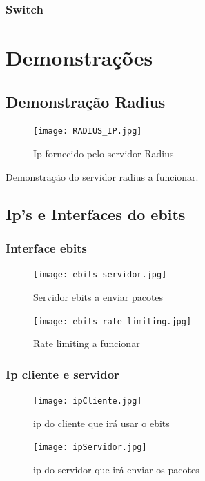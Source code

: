 \documentclass[a4paper,titlepage]{article}
\begin{document}
						\subsubsection{Switch}
							
	\section{Demonstrações}
			\subsection{Demonstração Radius}
						\begin{figure}[H]
								\centering
								\texttt{[image: RADIUS\_IP.jpg]}
								\caption{Ip fornecido pelo servidor Radius}
						\end{figure}
						Demonstração do servidor radius a funcionar.\\
						
			\subsection{Ip's e Interfaces do ebits}
					\subsubsection{Interface ebits}
						\begin{figure}[H]
								\centering
								\texttt{[image: ebits\_servidor.jpg]}
								\caption{Servidor ebits a enviar pacotes}
						\end{figure}
						\begin{figure}[H]
								\centering
								\texttt{[image: ebits-rate-limiting.jpg]}
								\caption{Rate limiting a funcionar}
						\end{figure}
					\subsubsection{Ip cliente e servidor}
						\begin{figure}[H]
								\centering
								\texttt{[image: ipCliente.jpg]}
								\caption{ip do cliente que irá usar o ebits}
						\end{figure}
						\begin{figure}[H]
								\centering
								\texttt{[image: ipServidor.jpg]}
								\caption{ip do servidor que irá enviar os pacotes}
						\end{figure}
			
\end{document}
